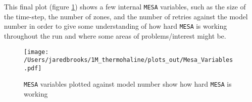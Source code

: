 \documentclass{article}
\begin{document}
        \pagebreak

        This final plot (figure \ref{fig:7}) shows a few internal \texttt{MESA} variables, such as the size of the time-step, the number of zones, and the number of retries against the model number in order to give some understanding of how hard \texttt{MESA} is working throughout the run and where some areas of problems/interest might be.

        \begin{figure}[H]
          \centering
          \texttt{[image: /Users/jaredbrooks/1M\_thermohaline/plots\_out/Mesa\_Variables.pdf]}
          \caption{\texttt{MESA} variables plotted against model number show how hard \texttt{MESA} is working}
          \label{fig:7}
        \end{figure}
\end{document}

